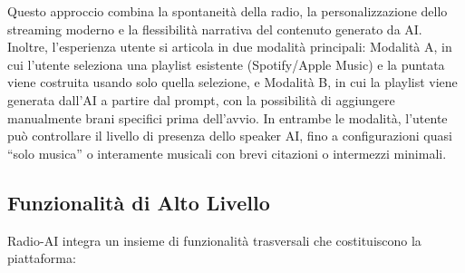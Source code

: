 \documentclass[11pt,a4paper]{article}
\begin{document}
Questo approccio combina la spontaneità della radio, la personalizzazione dello streaming moderno e la flessibilità narrativa del contenuto generato da AI.
Inoltre, l’esperienza utente si articola in due modalità principali: Modalità A, in cui l’utente seleziona una playlist esistente (Spotify/Apple Music) e la puntata viene costruita usando solo quella selezione, e Modalità B, in cui la playlist viene generata dall’AI a partire dal prompt, con la possibilità di aggiungere manualmente brani specifici prima dell’avvio. In entrambe le modalità, l’utente può controllare il livello di presenza dello speaker AI, fino a configurazioni quasi “solo musica” o interamente musicali con brevi citazioni o intermezzi minimali.

\subsection{Funzionalità di Alto Livello}

Radio-AI integra un insieme di funzionalità trasversali che costituiscono la piattaforma:
\end{document}
